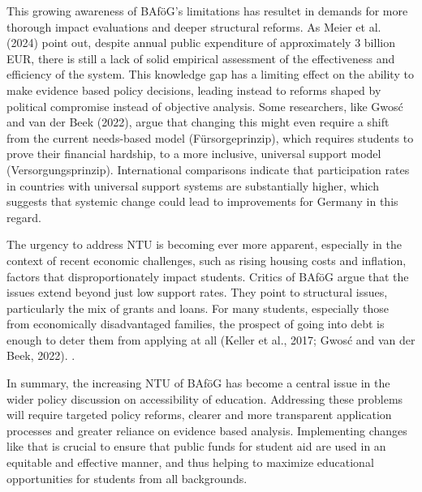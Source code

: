 This growing awareness of BAföG’s limitations has resultet in demands for more thorough impact evaluations and deeper structural reforms. As Meier et al. (2024) point out, despite annual public expenditure of approximately 3 billion EUR, there is still a lack of solid empirical assessment of the effectiveness and efficiency of the system. This knowledge gap has a limiting effect on the ability to make evidence based policy decisions, leading instead to reforms shaped by political compromise instead of objective analysis. Some researchers, like Gwosć and van der Beek (2022), argue that changing this might even require a shift from the current needs-based model (Fürsorgeprinzip), which requires students to prove their financial hardship, to a more inclusive, universal support model (Versorgungsprinzip). International comparisons indicate that participation rates in countries with universal support systems are substantially higher, which suggests that systemic change could lead to improvements for Germany in this regard.

The urgency to address NTU is becoming ever more apparent, especially in the context of recent economic challenges, such as rising housing costs and inflation, factors that disproportionately impact students. Critics of BAföG argue that the issues extend beyond just low support rates. They point to structural issues, particularly the mix of grants and loans. For many students, especially those from economically disadvantaged families, the prospect of going into debt is enough to deter them from applying at all (Keller et al., 2017; Gwosć and van der Beek, 2022).
\citep{gwosc_krisenbewaltigung_2022}.

In summary, the increasing NTU of BAföG has become a central issue in the wider policy discussion on accessibility of education. Addressing these problems will require targeted policy reforms, clearer and more transparent application processes and greater reliance on evidence based analysis. Implementing changes like that is crucial to ensure that public funds for student aid are used in an equitable and effective manner, and thus helping to maximize educational opportunities for students from all backgrounds.



